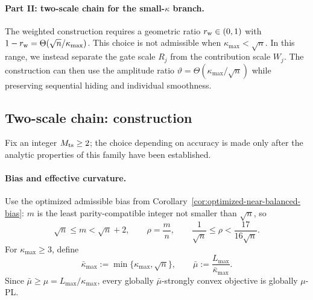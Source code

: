 \documentclass{article}
\theoremstyle{definition}
\begin{document}
\paragraph{Part II: two-scale chain for the small-$\kappa$ branch.}
The weighted construction requires a geometric ratio $r_{\rm w}\in(0,1)$ with
$1-r_{\rm w}=\Theta(\sqrt n/\kappa_{\max})$.  This choice is not admissible when
$\kappa_{\max}<\sqrt n$.  In this range, we instead separate the gate scale
$R_j$ from the contribution scale $W_j$.  The construction can then use the
amplitude ratio $\vartheta=\Theta(\kappa_{\max}/\sqrt n)$ while preserving
sequential hiding and individual smoothness.

\subsection{Two-scale chain: construction}
\label{app:two-scale-construction}

Fix an integer $M_{\rm ts}\ge2$; the choice depending on accuracy is made only
after the analytic properties of this family have been established.

\paragraph{Bias and effective curvature.}
Use the optimized admissible bias from Corollary~\ref{cor:optimized-near-balanced-bias}:
$m$ is the least parity-compatible integer not smaller than $\sqrt n$, so
\begin{equation}
 \sqrt n\le m<\sqrt n+2,
 \qquad \rho=\frac mn,
 \qquad \frac1{\sqrt n}\le\rho<\frac{17}{16\sqrt n}.
 \label{eq:two-scale-local-optimized-bias}
\end{equation}
For $\kappa_{\max}\ge3$, define
\begin{equation}
 \bar\kappa_{\max}:=\min\{\kappa_{\max},\sqrt n\},
 \qquad
 \bar\mu:=\frac{L_{\max}}{\bar\kappa_{\max}}.
 \label{eq:two-scale-effective-parameters}
\end{equation}
Since $\bar\mu\ge\mu=L_{\max}/\kappa_{\max}$, every globally
$\bar\mu$-strongly convex objective is globally $\mu$-PL.
\end{document}
